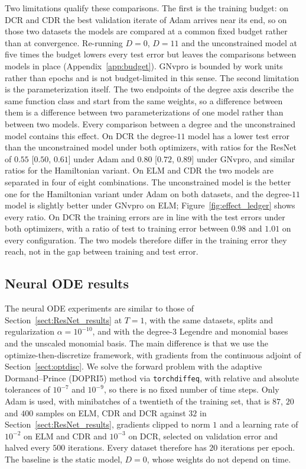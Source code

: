 \documentclass[pdflatex,sn-mathphys-num]{sn-jnl}%
\theoremstyle{thmstyleone}%
\theoremstyle{thmstyletwo}%
\theoremstyle{thmstylethree}%
\begin{document}
Two limitations qualify these comparisons. The first is the training budget: on DCR and CDR the best validation iterate of Adam arrives near its end, so on those two datasets the models are compared at a common fixed budget rather than at convergence. Re-running $D=0$, $D=11$ and the unconstrained model at five times the budget lowers every test error but leaves the comparisons between models in place (Appendix~\ref{app:budget}). GNvpro is bounded by work units rather than epochs and is not budget-limited in this sense.
%
The second limitation is the parameterization itself. The two endpoints of the degree axis describe the same function class and start from the same weights, so a difference between them is a difference between two parameterizations of one model rather than between two models. Every comparison between a degree and the unconstrained model contains this effect.
%
On DCR the degree-$11$ model has a lower test error than the unconstrained model under both optimizers, with ratios for the ResNet of $0.55$ [$0.50$, $0.61$] under Adam and $0.80$ [$0.72$, $0.89$] under GNvpro, and similar ratios for the Hamiltonian variant.
%
On ELM and CDR the two models are separated in four of eight combinations. The unconstrained model is the better one for the Hamiltonian variant under Adam on both datasets, and the degree-$11$ model is slightly better under GNvpro on ELM; Figure~\ref{fig:effect_ledger} shows every ratio.
%
On DCR the training errors are in line with the test errors under both optimizers, with a ratio of test to training error between $0.98$ and $1.01$ on every configuration. The two models therefore differ in the training error they reach, not in the gap between training and test error.


\subsection{Neural ODE results}\label{sect:NODE_results}
The neural ODE experiments are similar to those of Section~\ref{sect:ResNet_results} at $T=1$, with the same datasets, splits and regularization $\alpha=10^{-10}$, and with the degree-$3$ Legendre and monomial bases and the unscaled monomial basis.
%
The main difference is that we use the optimize-then-discretize framework, with gradients from the continuous adjoint of Section~\ref{sect:optdisc}. We solve the forward problem with the adaptive Dormand--Prince (DOPRI5) method via \texttt{torchdiffeq}, with relative and absolute tolerances of $10^{-7}$ and $10^{-9}$, so there is no fixed number of time steps. Only Adam is used, with minibatches of a twentieth of the training set, that is $87$, $20$ and $400$ samples on ELM, CDR and DCR against $32$ in Section~\ref{sect:ResNet_results}, gradients clipped to norm $1$ and a learning rate of $10^{-2}$ on ELM and CDR and $10^{-3}$ on DCR, selected on validation error and halved every $500$ iterations. Every dataset therefore has $20$ iterations per epoch. The baseline is the static model, $D=0$, whose weights do not depend on time.
\end{document}
